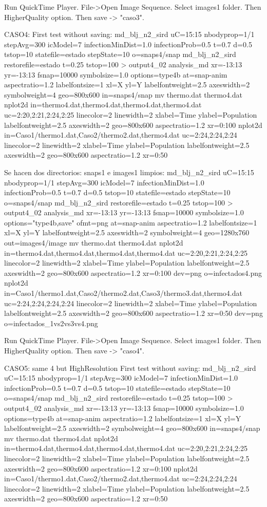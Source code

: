 Run QuickTime Player.  File->Open Image Sequence. Select images1 folder. Then HigherQuality option. Then save -> "caso3".

CASO4:
First test without saving:
md_blj_n2_sird uC=15:15 nbodyprop=1/1 stepAvg=300 icModel=7 infectionMinDist=1.0 infectionProb=0.5 t=0.7 d=0.5 tstop=10 statefile=estado stepState=10  o=snaps4/snap%
md_blj_n2_sird restorefile=estado t=0.25 tstop=100 > output4_02
analysis_md xr=-13:13 yr=-13:13 fsnap=10000 symbolsize=1.0 options=type4b at=snap-anim  aspectratio=1.2 labelfontsize=1 xl=X yl=Y labelfontweight=2.5 axeswidth=2 symbolweight=4 geo=800x600 in=snaps4/snap%
mv thermo.dat thermo4.dat
nplot2d in=thermo4.dat,thermo4.dat,thermo4.dat,thermo4.dat uc=2:20,2:21,2:24,2:25 linecolor=2 linewidth=2 xlabel=Time ylabel=Population labelfontweight=2.5 axeswidth=2 geo=800x600 aspectratio=1.2 xr=0:100
nplot2d in=Caso1/thermo1.dat,Caso2/thermo2.dat,thermo4.dat uc=2:24,2:24,2:24 linecolor=2 linewidth=2 xlabel=Time ylabel=Population labelfontweight=2.5 axeswidth=2 geo=800x600 aspectratio=1.2 xr=0:50


Se hacen dos directorios: snaps1 e images1 limpios:
md_blj_n2_sird uC=15:15 nbodyprop=1/1 stepAvg=300 icModel=7 infectionMinDist=1.0 infectionProb=0.5 t=0.7 d=0.5 tstop=10 statefile=estado stepState=10  o=snaps4/snap%
md_blj_n2_sird restorefile=estado t=0.25 tstop=100 > output4_02
analysis_md xr=-13:13 yr=-13:13 fsnap=10000 symbolsize=1.0 options="type4b,save" ofmt=png at=snap-anim  aspectratio=1.2 labelfontsize=1 xl=X yl=Y labelfontweight=2.5 axeswidth=2 symbolweight=4 geo=1280x760 out=images4/image%
mv thermo.dat thermo4.dat
nplot2d in=thermo4.dat,thermo4.dat,thermo4.dat,thermo4.dat uc=2:20,2:21,2:24,2:25 linecolor=2 linewidth=2 xlabel=Time ylabel=Population labelfontweight=2.5 axeswidth=2 geo=800x600 aspectratio=1.2 xr=0:100 dev=png o=infectados4.png
nplot2d in=Caso1/thermo1.dat,Caso2/thermo2.dat,Caso3/thermo3.dat,thermo4.dat uc=2:24,2:24,2:24,2:24 linecolor=2 linewidth=2 xlabel=Time ylabel=Population labelfontweight=2.5 axeswidth=2 geo=800x600 aspectratio=1.2 xr=0:50 dev=png o=infectados_1vs2vs3vs4.png

Run QuickTime Player.  File->Open Image Sequence. Select images1 folder. Then HigherQuality option. Then save -> "caso4".

CASO5: same 4 but HighResolution
First test without saving:
md_blj_n2_sird uC=15:15 nbodyprop=1/1 stepAvg=300 icModel=7 infectionMinDist=1.0 infectionProb=0.5 t=0.7 d=0.5 tstop=10 statefile=estado stepState=10  o=snaps4/snap%
md_blj_n2_sird restorefile=estado t=0.25 tstop=100 > output4_02
analysis_md xr=-13:13 yr=-13:13 fsnap=10000 symbolsize=1.0 options=type4b at=snap-anim  aspectratio=1.2 labelfontsize=1 xl=X yl=Y labelfontweight=2.5 axeswidth=2 symbolweight=4 geo=800x600 in=snaps4/snap%
mv thermo.dat thermo4.dat
nplot2d in=thermo4.dat,thermo4.dat,thermo4.dat,thermo4.dat uc=2:20,2:21,2:24,2:25 linecolor=2 linewidth=2 xlabel=Time ylabel=Population labelfontweight=2.5 axeswidth=2 geo=800x600 aspectratio=1.2 xr=0:100
nplot2d in=Caso1/thermo1.dat,Caso2/thermo2.dat,thermo4.dat uc=2:24,2:24,2:24 linecolor=2 linewidth=2 xlabel=Time ylabel=Population labelfontweight=2.5 axeswidth=2 geo=800x600 aspectratio=1.2 xr=0:50


